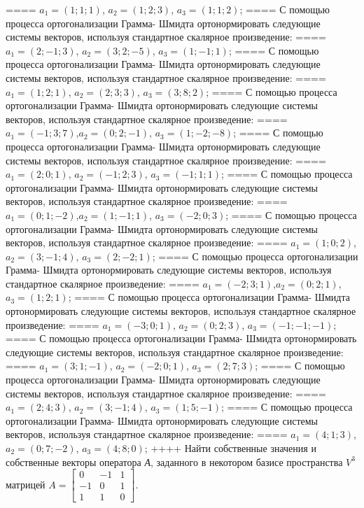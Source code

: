 ====
\(a_{1} = (1;1;1)\), \(a_{2} = (1;2;3)\), \(a_{3} = (1;1;2)\);
====
С помощью процесса ортогонализации Грамма- Шмидта ортонормировать следующие системы векторов, используя стандартное скалярное произведение:
====
\(a_{1} = (2; - 1;3)\), \(a_{2} = (3;2; - 5)\), \(a_{3} = (1; - 1;1)\);
====
С помощью процесса ортогонализации Грамма- Шмидта ортонормировать следующие системы векторов, используя стандартное скалярное произведение:
====
\(a_{1} = (1;2;1)\), \(a_{2} = (2;3;3)\), \(a_{3} = (3;8;2)\);
====
С помощью процесса ортогонализации Грамма- Шмидта ортонормировать следующие системы векторов, используя стандартное скалярное произведение:
====
\(a_{1} = ( - 1;3;7)\),\(a_{2} = (0;2; - 1)\), \(a_{3} = (1; - 2; - 8)\);
====
С помощью процесса ортогонализации Грамма- Шмидта ортонормировать следующие системы векторов, используя стандартное скалярное произведение:
====
\(a_{1} = (2;0;1)\), \(a_{2} = ( - 1;2;3)\), \(a_{3} = ( - 1;1;1)\);
====
С помощью процесса ортогонализации Грамма- Шмидта ортонормировать следующие системы векторов, используя стандартное скалярное произведение:
====
\(a_{1} = (0;1; - 2)\),\(a_{2} = (1; - 1;1)\), \(a_{3} = ( - 2;0;3)\);
====
С помощью процесса ортогонализации Грамма- Шмидта ортонормировать следующие системы векторов, используя стандартное скалярное произведение:
====
\(a_{1} = (1;0;2)\), \(a_{2} = (3; - 1;4)\), \(a_{3} = (2; - 2;1)\);
====
С помощью процесса ортогонализации Грамма- Шмидта ортонормировать следующие системы векторов, используя стандартное скалярное произведение:
====
\(a_{1} = ( - 2;3;1)\),\(a_{2} = (0;2;1)\), \(a_{3} = (1;2;1)\);
====
С помощью процесса ортогонализации Грамма- Шмидта ортонормировать следующие системы векторов, используя стандартное скалярное произведение:
====
\(a_{1} = ( - 3;0;1)\), \(a_{2} = (0;2;3)\), \(a_{3} = ( - 1; - 1; - 1)\);
====
С помощью процесса ортогонализации Грамма- Шмидта ортонормировать следующие системы векторов, используя стандартное скалярное произведение:
====
\(a_{1} = (3;1; - 1)\), \(a_{2} = ( - 2;0;1)\), \(a_{3} = (2;7;3)\);
====
С помощью процесса ортогонализации Грамма- Шмидта ортонормировать следующие системы векторов, используя стандартное скалярное произведение:
====
\(a_{1} = (2;4;3)\), \(a_{2} = (3; - 1;4)\), \(a_{3} = (1;5; - 1)\);
====
С помощью процесса ортогонализации Грамма- Шмидта ортонормировать следующие системы векторов, используя стандартное скалярное произведение:
====
\(a_{1} = (4;1;3)\), \(a_{2} = (0;7; - 2)\), \(a_{3} = (4;8;0)\);
++++
Найти собственные значения и собственные векторы оператора \emph{А}, заданного в некотором базисе пространства \(V^{3}\) матрицей \(A = \begin{bmatrix}
0 & - 1 & 1 \\
 - 1 & 0 & 1 \\
1 & 1 & 0
\end{bmatrix}.\)
